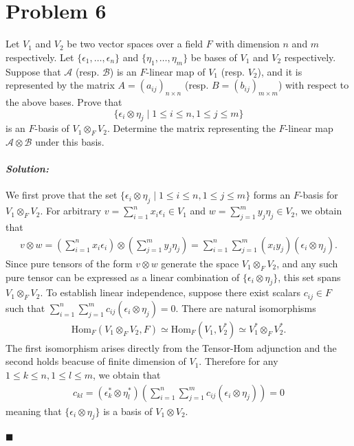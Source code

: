 \documentclass[12pt, a4paper]{article}
\newenvironment{solution}
  {\paragraph{\textit{Solution:}}\par\medskip}
  {\hfill$\blacksquare$\vspace{0.1cm}}
\begin{document}
\section*{Problem 6}
Let $V_1$ and $V_2$ be two vector spaces over a field $F$ with dimension $n$ and $m$ respectively. Let $\{\epsilon_1, \dots, \epsilon_n\}$ and $\{\eta_1, \dots, \eta_m\}$ be bases of $V_1$ and $V_2$ respectively. Suppose that $\mathscr{A}$ (resp. $\mathscr{B}$) is an $F$-linear map of $V_1$ (resp. $V_2$), and it is represented by the matrix $A = (a_{ij})_{n \times n}$ (resp. $B = (b_{ij})_{m \times m}$) with respect to the above bases. Prove that 
\[ \{\epsilon_i \otimes \eta_j \mid 1 \le i \le n, 1 \le j \le m\} \]
is an $F$-basis of $V_1 \otimes_F V_2$. Determine the matrix representing the $F$-linear map $\mathscr{A} \otimes \mathscr{B}$ under this basis.
\begin{solution}
    We first prove that the set $\{\epsilon_i \otimes \eta_j \mid 1 \leq i \leq n, 1 \leq j \leq m\}$ forms an $F$-basis for $V_1 \otimes_F V_2$.
    For arbitrary $v=\sum_{i=1}^n x_i \epsilon_i \in V_1$ and $w =\sum_{j=1}^m y_j \eta_j\in V_2$, we obtain that 
    \begin{align*}
        v \otimes w = (\sum_{i=1}^n x_i \epsilon_i) \otimes (\sum_{j=1}^m y_j \eta_j) = \sum_{i=1}^n \sum_{j=1}^m (x_i y_j) (\epsilon_i \otimes \eta_j).
    \end{align*}
    Since pure tensors of the form $v \otimes w$ generate the space $V_1 \otimes_F V_2$, and any such pure tensor can be expressed as a linear combination of $\{\epsilon_i \otimes \eta_j\}$, this set spans $V_1 \otimes_F V_2$.
    To establish linear independence, suppose there exist scalars $c_{ij} \in F$ such that $\sum_{i=1}^n \sum_{j=1}^m c_{ij} (\epsilon_i \otimes \eta_j) = 0$.
    There are natural isomorphisms
    \begin{align*}
        \text{Hom}_F(V_1\otimes_F V_2,F)\simeq \text{Hom}_F(V_1,V_2^*)\simeq V_1^* \otimes_F V_2^*.
    \end{align*}
    The first isomorphism arises directly from the Tensor-Hom adjunction and the second holds beacuse of finite dimension of $V_1$.  Therefore for any $1\le k\le n,1\le l\le m$, we obtain that
    \begin{align*}
        c_{kl} = (\epsilon_k^*\otimes \eta_l^*)\left(\sum_{i=1}^n \sum_{j=1}^m c_{ij} (\epsilon_i \otimes \eta_j)\right)  = 0
    \end{align*}
    meaning that $\{\epsilon_i \otimes \eta_j\}$ is a basis of $V_1\otimes V_2$.


\end{solution}
\end{document}
